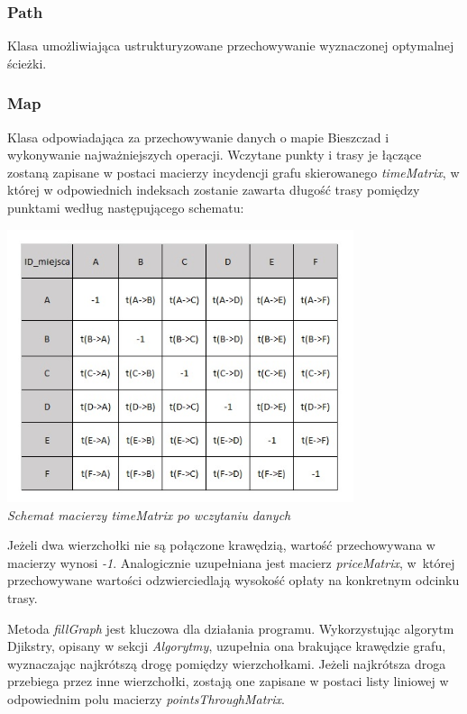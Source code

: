 \documentclass{article}
\begin{document}
\subsubsection{Path}
Klasa umożliwiająca ustrukturyzowane przechowywanie wyznaczonej optymalnej ścieżki.

\subsubsection{Map}
Klasa odpowiadająca za przechowywanie danych o mapie Bieszczad i wykonywanie najważniejszych operacji. Wczytane punkty i trasy je łączące zostaną zapisane w postaci macierzy incydencji grafu skierowanego \textit{timeMatrix}, w której w odpowiednich indeksach zostanie zawarta długość trasy pomiędzy punktami według następującego schematu:

\begin{center}
    \includegraphics[height=8cm]{timeMatrix.jpg} \\
    \textit{Schemat macierzy timeMatrix po wczytaniu danych}
\end{center}

Jeżeli dwa wierzchołki nie są połączone krawędzią, wartość przechowywana w macierzy wynosi \textit{-1}. Analogicznie uzupełniana jest macierz \textit{priceMatrix}, w~której przechowywane wartości odzwierciedlają wysokość opłaty na konkretnym odcinku trasy.

Metoda \textit{fillGraph} jest kluczowa dla działania programu. Wykorzystując algorytm Djikstry, opisany w sekcji \textit{Algorytmy}, uzupełnia ona brakujące krawędzie grafu, wyznaczając najkrótszą drogę pomiędzy wierzchołkami. Jeżeli najkrótsza droga przebiega przez inne wierzchołki, zostają one zapisane w postaci listy liniowej w odpowiednim polu macierzy \textit{pointsThroughMatrix}. 
\end{document}
